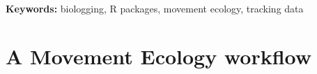 \documentclass[a4paper,12pt]{article}
\begin{document}
\noindent \textbf{Keywords:} biologging, R packages, movement ecology, tracking data



\newpage


\section*{A Movement Ecology workflow}
%
\end{document}
